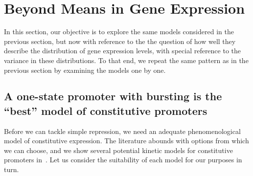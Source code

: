 \section{Beyond Means in Gene Expression}
\label{sec:beyond_means}
 
In this section, our objective is to explore the same models considered in
the previous section, but now with reference to the the question of
how well they describe the distribution of gene expression levels, with
special reference to the variance in these distributions.  To that end,
we repeat the same pattern as in the previous section by examining
the models one by one.

\subsection{A one-state promoter with bursting is the ``best'' model of constitutive promoters}
Before we can tackle simple repression, we need an adequate phenomenological
model of constitutive expression. The literature abounds with options from which
we can choose, and we show several potential kinetic models for constitutive
promoters in~. Let us consider the suitability of each
model for our purposes in turn.

